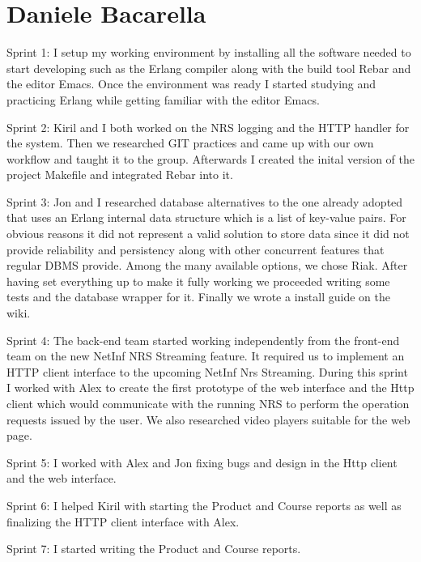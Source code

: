 \section{Daniele Bacarella}

Sprint 1:
I setup my working environment by installing all the software needed to start developing such as the Erlang compiler along with the build tool Rebar and the editor Emacs.
Once the environment was ready I started studying and practicing Erlang while getting familiar with the editor Emacs.

Sprint 2:
Kiril and I both worked on the NRS logging and the HTTP handler for the system. Then we researched GIT practices and came up with our own workflow and taught it to the group.
Afterwards I created the inital version of the project Makefile and integrated Rebar into it.

Sprint 3:
Jon and I researched database alternatives to the one already adopted that uses an Erlang internal data structure which is a list of key-value pairs. For obvious reasons it did not represent a valid solution to store data since it did not provide reliability and persistency along with other concurrent features that regular DBMS provide.
Among the many available options, we chose Riak.
After having set everything up to make it fully working we proceeded writing some tests and the database wrapper for it.
Finally we wrote a install guide on the wiki. 

Sprint 4:
The back-end team started working independently from the front-end team on the new NetInf NRS Streaming feature.
It required us to implement an HTTP client interface to the upcoming NetInf Nrs Streaming.
During this sprint I worked with Alex to create the first prototype of the web interface and the Http client which would communicate with the running NRS to perform the operation requests issued by the user.
We also researched video players suitable for the web page.

Sprint 5:
I worked with Alex and Jon fixing bugs and design in the Http client and the web interface.

Sprint 6:
I helped Kiril with starting the Product and Course reports as well as finalizing the HTTP client interface with Alex.

Sprint 7:
I started writing the Product and Course reports.
